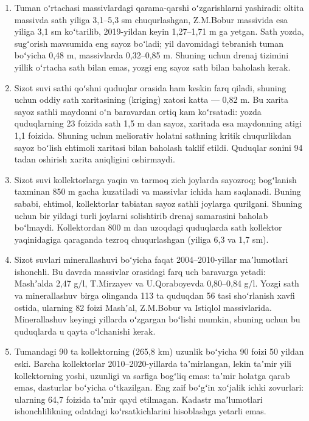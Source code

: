 \documentclass[14pt,a4paper,oneside]{extreport}
\begin{document}
\begin{enumerate}
\item
  Tuman oʻrtachasi massivlardagi qarama-qarshi oʻzgarishlarni yashiradi:
  oltita massivda sath yiliga 3,1--5,3 sm chuqurlashgan, Z.M.Bobur
  massivida esa yiliga 3,1 sm koʻtarilib, 2019-yildan keyin 1,27--1,71 m
  ga yetgan. Sath yozda, sugʻorish mavsumida eng sayoz boʻladi; yil
  davomidagi tebranish tuman boʻyicha 0,48 m, massivlarda 0,32--0,85 m.
  Shuning uchun drenaj tizimini yillik oʻrtacha sath bilan emas, yozgi
  eng sayoz sath bilan baholash kerak.
\item
  Sizot suvi sathi qoʻshni quduqlar orasida ham keskin farq qiladi,
  shuning uchun oddiy sath xaritasining (kriging) xatosi katta --- 0,82
  m. Bu xarita sayoz sathli maydonni oʻn baravardan ortiq kam
  koʻrsatadi: yozda quduqlarning 23 foizida sath 1,5 m dan sayoz,
  xaritada esa maydonning atigi 1,1 foizida. Shuning uchun meliorativ
  holatni sathning kritik chuqurlikdan sayoz boʻlish ehtimoli xaritasi
  bilan baholash taklif etildi. Quduqlar sonini 94 tadan oshirish xarita
  aniqligini oshirmaydi.
\item
  Sizot suvi kollektorlarga yaqin va tarmoq zich joylarda sayozroq;
  bogʻlanish taxminan 850 m gacha kuzatiladi va massivlar ichida ham
  saqlanadi. Buning sababi, ehtimol, kollektorlar tabiatan sayoz sathli
  joylarga qurilgani. Shuning uchun bir yildagi turli joylarni
  solishtirib drenaj samarasini baholab boʻlmaydi. Kollektordan 800 m
  dan uzoqdagi quduqlarda sath kollektor yaqinidagiga qaraganda tezroq
  chuqurlashgan (yiliga 6,3 va 1,7 sm).
\item
  Sizot suvlari minerallashuvi boʻyicha faqat 2004--2010-yillar
  maʼlumotlari ishonchli. Bu davrda massivlar orasidagi farq uch
  baravarga yetadi: Mashʼalda 2,47 g/l, T.Mirzayev va U.Qoraboyevda
  0,80--0,84 g/l. Yozgi sath va minerallashuv birga olinganda 113 ta
  quduqdan 56 tasi shoʻrlanish xavfi ostida, ularning 82 foizi Mashʼal,
  Z.M.Bobur va Istiqlol massivlarida. Minerallashuv keyingi yillarda
  oʻzgargan boʻlishi mumkin, shuning uchun bu quduqlarda u qayta
  oʻlchanishi kerak.
\item
  Tumandagi 90 ta kollektorning (265,8 km) uzunlik boʻyicha 90 foizi 50
  yildan eski. Barcha kollektorlar 2010--2020-yillarda taʼmirlangan,
  lekin taʼmir yili kollektorning yoshi, uzunligi va sarfiga bogʻliq
  emas: taʼmir holatga qarab emas, dasturlar boʻyicha oʻtkazilgan. Eng
  zaif boʻgʻin xoʻjalik ichki zovurlari: ularning 64,7 foizida taʼmir
  qayd etilmagan. Kadastr maʼlumotlari ishonchlilikning odatdagi
  koʻrsatkichlarini hisoblashga yetarli emas.

\end{enumerate}
\end{document}
